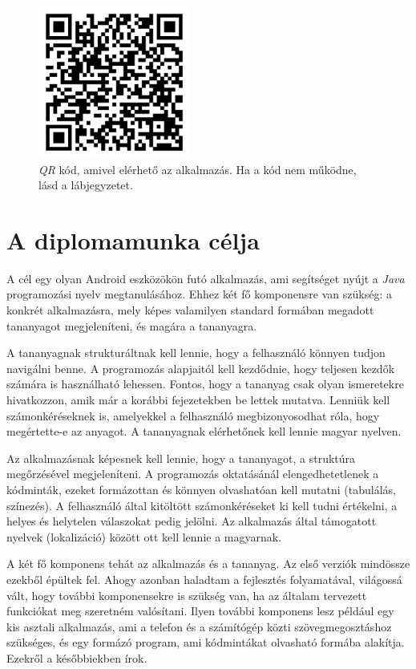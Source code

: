 \documentclass[12pt,a4paper]{article}
\begin{document}
	 \begin{figure}[h!]
	 	\centering
	 	\includegraphics[width=5cm]{learn_java_qr_code}
	 	\caption[Alkalmazás QR Caption]{\textit{QR} kód, amivel elérhető az alkalmazás. Ha a kód nem működne, lásd a lábjegyzetet\footnotemark.}
	 	\label{qr}
	 \end{figure}

	\section{A diplomamunka célja}
	
	A cél egy olyan Android eszközökön futó alkalmazás, ami segítséget nyújt a \textit{Java} programozási nyelv megtanulásához. Ehhez két fő komponensre van szükség: a konkrét alkalmazásra, mely képes valamilyen standard formában megadott tananyagot megjeleníteni, és magára a tananyagra. 

	A tananyagnak strukturáltnak kell lennie, hogy a felhasználó könnyen tudjon navigálni benne. A programozás alapjaitól kell kezdődnie, hogy teljesen kezdők számára is használható lehessen. Fontos, hogy a tananyag csak olyan ismeretekre hivatkozzon, amik már a korábbi fejezetekben be lettek mutatva. Lenniük kell számonkéréseknek is, amelyekkel a felhasználó megbizonyosodhat róla, hogy megértette-e az anyagot. A tananyagnak elérhetőnek kell lennie magyar nyelven.
	
	Az alkalmazásnak képesnek kell lennie, hogy a tananyagot, a struktúra megőrzésével megjeleníteni. A programozás oktatásánál elengedhetetlenek a kódminták, ezeket formázottan és könnyen olvashatóan kell mutatni (tabulálás, színezés). A felhasználó által kitöltött számonkéréseket ki kell tudni értékelni, a helyes és helytelen válaszokat pedig jelölni. Az alkalmazás által támogatott nyelvek (lokalizáció) között ott kell lennie a magyarnak.
	
	A két fő komponens tehát az alkalmazás és a tananyag. Az első verziók mindössze ezekből épültek fel. Ahogy azonban haladtam a fejlesztés folyamatával, világossá vált, hogy további komponensekre is szükség van, ha az általam tervezett funkciókat meg szeretném valósítani. Ilyen további komponens lesz például egy kis asztali alkalmazás, ami a telefon és a számítógép közti szövegmegosztáshoz szükséges, és egy formázó program, ami kódmintákat olvasható formába alakítja. Ezekről a későbbiekben írok.
	
\end{document}
